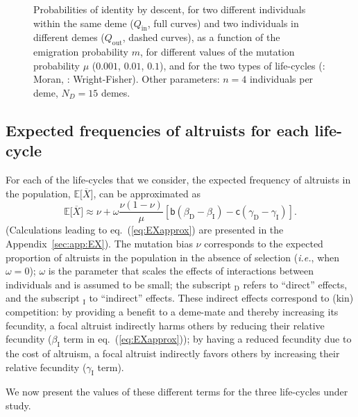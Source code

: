 \documentclass[11pt, letterpaper]{article}
\renewcommand{\eqref}[1]{\textup{{\normalfont eq.~(\ref{#1}}\normalfont)}}
\newcommand{\ie}{\textit{i.e.}}
\newcommand{\Esp}[1]{\mathbb{E}\big[ #1\big]}%
\newcommand{\appname}[0]{Appendix}
\newcommand{\bb}{\mathsf{b}}
\newcommand{\cc}{\mathsf{c}}
\newcommand{\direct}{\mathrm{D}}
\newcommand{\indirect}{\mathrm{I}}
\newcommand{\mutbias}{\nu}
\newcommand{\Qin}{Q_{\textrm{in}}}
\newcommand{\Qout}{Q_{\textrm{out}}}
\newcommand{\ndemes}{N_D}
\begin{document}
\begin{figure}
\begin{tabular}{cc}
\end{tabular}
\caption{Probabilities of identity by descent, for two different individuals within the same deme ($\Qin$, full curves) and two individuals in different demes ($\Qout$, dashed curves), as a function of the emigration probability $m$, for different values of the mutation probability $\mu$ ($0.001$, $0.01$, $0.1$), and for the two types of life-cycles (: Moran, : Wright-Fisher). Other parameters: $n=4$ individuals per deme, $\ndemes = 15$ demes. }
\label{fig:Q}
\end{figure}

\clearpage
\subsection{Expected frequencies of altruists for each life-cycle}

For each of the life-cycles that we consider, the expected frequency of altruists in the population, $\Esp{\overline{X}}$, can be approximated as
\begin{equation}\label{eq:EXapprox}
\Esp{\overline{X}} \approx \mutbias + \omega \frac{\mutbias (1-\mutbias)}{\mu} \left[ \bb \left( \beta_{\direct} - \beta_{\indirect} \right) - \cc \left( \gamma_{\direct} - \gamma_{\indirect} \right) \right].
\end{equation}
(Calculations leading to \eqref{eq:EXapprox} are presented in the \appname~\ref{sec:app:EX}). The mutation bias $\mutbias$ corresponds to the expected proportion of altruists in the population in the absence of selection (\ie, when $\omega = 0$); $\omega$ is the parameter that scales the effects of interactions between individuals and is assumed to be small; the subscript $_{\direct}$ refers to ``direct'' effects, and the subscript $_{\indirect}$ to ``indirect'' effects. These indirect effects correspond to (kin) competition: by providing a benefit to a deme-mate and thereby increasing its fecundity, a focal altruist indirectly harms others by reducing their relative fecundity ($\beta_{\indirect}$ term in \eqref{eq:EXapprox}); by having a reduced fecundity due to the cost of altruism, a focal altruist indirectly favors others by increasing their relative fecundity ($\gamma_{\indirect}$ term).

We now present the values of these different terms for the three life-cycles under study.  
\end{document}
